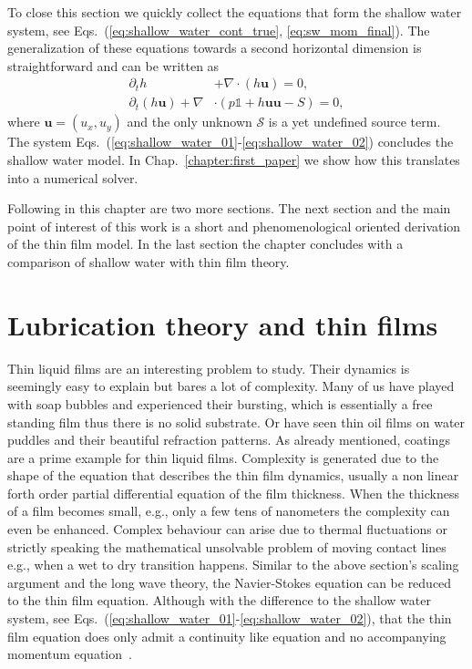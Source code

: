 To close this section we quickly collect the equations that form the shallow water system, see Eqs.~(\ref{eq:shallow_water_cont_true}, \ref{eq:sw_mom_final}).
The generalization of these equations towards a second horizontal dimension is straightforward and can be written as~\cite{salmonLatticeBoltzmannMethod1999, dellarNonhydrodynamicModesPriori2002, thommesLatticeBoltzmannMethods2007}
\begin{align}    
        \partial_t h &+ \nabla \cdot (h\mathbf{u}) = 0, \label{eq:shallow_water_01}\\
        \partial_t (h\mathbf{u}) + \nabla&\cdot (p \mathbb{1} + h\mathbf{u}\mathbf{u} - S) = 0, \label{eq:shallow_water_02} 
\end{align}
where $\mathbf{u} = (u_x, u_y)$ and the only unknown $\mathcal{S}$ is a yet undefined source term. 
The system Eqs.~(\ref{eq:shallow_water_01}-\ref{eq:shallow_water_02}) concludes the shallow water model. 
In Chap.~\ref{chapter:first_paper} we show how this translates into a numerical solver.

Following in this chapter are two more sections.
The next section and the main point of interest of this work is a short and phenomenological oriented derivation of the thin film model.
In the last section the chapter concludes with a comparison of shallow water with thin film theory.

\section{Lubrication theory and thin films}
\label{sec:thin_films}
Thin liquid films are an interesting problem to study.
Their dynamics is seemingly easy to explain but bares a lot of complexity.
Many of us have played with soap bubbles and experienced their bursting, which is essentially a free standing film thus there is no solid substrate.
Or have seen thin oil films on water puddles and their beautiful refraction patterns.
As already mentioned, coatings are a prime example for thin liquid films. 
Complexity is generated due to the shape of the equation that describes the thin film dynamics, usually a non linear forth order partial differential equation of the film thickness.
When the thickness of a film becomes small, e.g., only a few tens of nanometers the complexity can even be enhanced. 
Complex behaviour can arise due to thermal fluctuations or strictly speaking the mathematical unsolvable problem of moving contact lines e.g., when a wet to dry transition happens.
Similar to the above section's scaling argument and the long wave theory, the Navier-Stokes equation can be reduced to the thin film equation. 
Although with the difference to the shallow water system, see Eqs.~(\ref{eq:shallow_water_01}-\ref{eq:shallow_water_02}), that the thin film equation does only admit a continuity like equation and no accompanying momentum equation~\cite{oronLongscaleEvolutionThin1997, degennesWettingStaticsDynamics1985, crasterDynamicsStabilityThin2009}.

